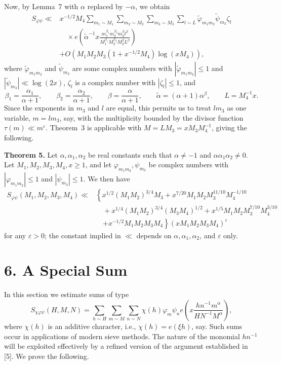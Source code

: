 \documentclass[10pt]{article}
\begin{document}
Now, by Lemma~7 with $\alpha$ replaced by $-\alpha$, we obtain
\[
\begin{aligned}
S_{\varphi\psi}\ll{}&x^{-1/2}M_4
 \sum_{m_1\sim M_1}\sum_{m_2\sim M_2}\sum_{m_3\sim M_3}\sum_{l\sim L}
 \widetilde\varphi_{m_1m_2}\widetilde\psi_{m_3}\zeta_l\\
&\quad\times e\left(\widetilde\alpha^{-1}x
 \frac{m_1^{\beta_1}m_2^{\beta_2}m_3^\beta l^\beta}
      {M_1^{\beta_1}M_2^{\beta_2}M_3^\beta L^\beta}\right)\\
&+O\left(M_1M_2M_3(1+x^{-1/2}M_4)\log(xM_4)\right),
\end{aligned}
\]
where $\widetilde\varphi_{m_1m_2}$ and $\widetilde\psi_{m_3}$ are some
complex numbers with $|\widetilde\varphi_{m_1m_2}|\le1$ and
$|\widetilde\psi_{m_3}|\ll\log(2x)$, $\zeta_l$ is a complex number with
$|\zeta_l|\le1$, and
\[
 \beta_1=\frac{\alpha_1}{\alpha+1},\qquad
 \beta_2=\frac{\alpha_2}{\alpha+1},\qquad
 \beta=\frac{\alpha}{\alpha+1},\qquad
 \widetilde\alpha=(\alpha+1)\alpha^\beta,\qquad
 L=M_4^{-1}x.
\]
Since the exponents in $m_3$ and $l$ are equal, this permits us to treat
$l m_3$ as one variable, $m=l m_3$, say, with the multiplicity bounded by
the divisor function $\tau(m)\ll m^\varepsilon$. Theorem~3 is applicable
with $M=LM_3=xM_3M_4^{-1}$, giving the following.

\medskip
\noindent\textbf{Theorem 5.}
Let $\alpha,\alpha_1,\alpha_2$ be real constants such that $\alpha\ne-1$
and $\alpha\alpha_1\alpha_2\ne0$. Let $M_1,M_2,M_3,M_4,x\ge1$, and let
$\varphi_{m_1m_2},\psi_{m_3}$ be complex numbers with
$|\varphi_{m_1m_2}|\le1$ and $|\psi_{m_3}|\le1$. We then have
\[
\begin{aligned}
S_{\varphi\psi}(M_1,M_2,M_3,M_4)\ll{}&
 \left\{x^{1/2}(M_1M_2)^{3/4}M_3
 +x^{7/20}M_1M_2M_3^{11/10}M_4^{-1/10}\right.\\
&\quad+x^{1/4}(M_1M_2)^{3/4}(M_3M_4)^{1/2}
 +x^{1/5}M_1M_2M_3^{7/10}M_4^{3/10}\\
&\quad\left.+x^{-1/2}M_1M_2M_3M_4\right\}
 (xM_1M_2M_3M_4)^\varepsilon
\end{aligned}
\]
for any $\varepsilon>0$; the constant implied in $\ll$ depends on
$\alpha,\alpha_1,\alpha_2$, and $\varepsilon$ only.

\section*{6. A Special Sum}
In this section we estimate sums of type
\[
S_{\chi\varphi\psi}(H,M,N)
 =\sum_{h\sim H}\sum_{m\sim M}\sum_{n\sim N}
  \chi(h)\varphi_m\psi_n
  e\left(x\frac{h n^{-1}m^\alpha}{H N^{-1}M^\alpha}\right),
\]
where $\chi(h)$ is an additive character, i.e., $\chi(h)=e(\xi h)$, say.
Such sums occur in applications of modern sieve methods. The nature of the
monomial $h n^{-1}$ will be exploited effectively by a refined version of
the argument established in [5]. We prove the following.
\end{document}
